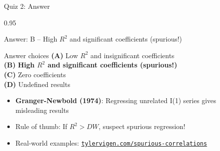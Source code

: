 \documentclass[9pt, aspectratio=169, t]{beamer}
\begin{document}
\begin{frame}{Quiz 2: Answer}
    \begin{cminipage}{0.95\textwidth}
    {\small
    \begin{exampleblock}{Answer: B -- High $R^2$ and significant coefficients (spurious!)}

    \begin{block}{Answer choices}
        \textcolor{MainBlue}{\textbf{(A)}} Low $R^2$ and insignificant coefficients \incorrect\\[3pt]
        \textcolor{MainBlue}{\textbf{(B)}} \textbf{\textcolor{Forest}{High $R^2$ and significant coefficients (spurious!)}} \correct\\[3pt]
        \textcolor{MainBlue}{\textbf{(C)}} Zero coefficients \incorrect\\[3pt]
        \textcolor{MainBlue}{\textbf{(D)}} Undefined results \incorrect
    \end{block}

        \vspace{0.2cm}

        \begin{itemize}
            \item \textbf{Granger-Newbold (1974)}: Regressing unrelated I(1) series gives misleading results
            \item Rule of thumb: If $R^2 > DW$, suspect spurious regression!
            \item {} Real-world examples: \href{https://www.tylervigen.com/spurious-correlations}{\texttt{tylervigen.com/spurious-correlations}}
        \end{itemize}
    \end{exampleblock}
    }
    \end{cminipage}
\end{frame}
\end{document}
